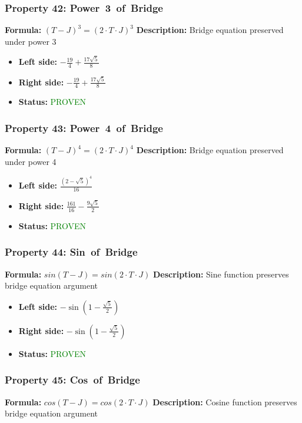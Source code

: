 \subsubsection*{Property 42: Power~3~of~Bridge}
\textbf{Formula:} $(T-J)^3 = (2 \cdot T \cdot J)^3$
\textbf{Description:} Bridge equation preserved under power 3

\begin{itemize}
\item \textbf{Left side:} $- \frac{19}{4} + \frac{17 \sqrt{5}}{8}$
\item \textbf{Right side:} $- \frac{19}{4} + \frac{17 \sqrt{5}}{8}$
\item \textbf{Status:} \textcolor{green}{PROVEN}
\end{itemize}

\subsubsection*{Property 43: Power~4~of~Bridge}
\textbf{Formula:} $(T-J)^4 = (2 \cdot T \cdot J)^4$
\textbf{Description:} Bridge equation preserved under power 4

\begin{itemize}
\item \textbf{Left side:} $\frac{\left(2 - \sqrt{5}\right)^{4}}{16}$
\item \textbf{Right side:} $\frac{161}{16} - \frac{9 \sqrt{5}}{2}$
\item \textbf{Status:} \textcolor{green}{PROVEN}
\end{itemize}

\subsubsection*{Property 44: Sin~of~Bridge}
\textbf{Formula:} $sin(T-J) = sin(2 \cdot T \cdot J)$
\textbf{Description:} Sine function preserves bridge equation argument

\begin{itemize}
\item \textbf{Left side:} $- \sin{\left(1 - \frac{\sqrt{5}}{2} \right)}$
\item \textbf{Right side:} $- \sin{\left(1 - \frac{\sqrt{5}}{2} \right)}$
\item \textbf{Status:} \textcolor{green}{PROVEN}
\end{itemize}

\subsubsection*{Property 45: Cos~of~Bridge}
\textbf{Formula:} $cos(T-J) = cos(2 \cdot T \cdot J)$
\textbf{Description:} Cosine function preserves bridge equation argument

